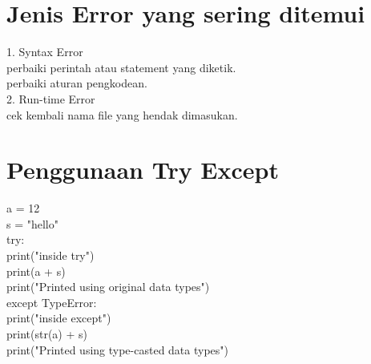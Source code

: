 \section{Jenis Error yang sering ditemui}

1. Syntax Error\\

       perbaiki perintah atau statement yang diketik.\\
       perbaiki aturan pengkodean.\\

2. Run-time Error\\
      
       cek kembali nama file yang hendak dimasukan.\\
 

\section{Penggunaan Try Except}

a = 12 \\
s = "hello" \\
try: \\
    print("inside try") \\
    print(a + s) \\ 
    print("Printed using original data types") \\
except TypeError: \\
    print("inside except") \\
    print(str(a) + s) \\
    print("Printed using type-casted data types") \\